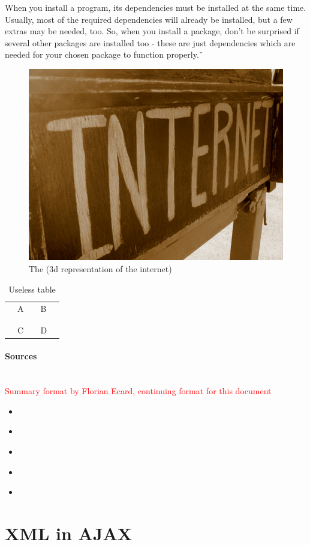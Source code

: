 \documentclass[10pt,a4paper]{article}
\begin{document}
When you install a program, its dependencies must be installed at the same time. Usually, most of the required dependencies will already be installed, but a few extras may be needed, too. So, when you install a package, don't be surprised if several other packages are installed too - these are just dependencies which are needed for your chosen package to function properly.¨\cite{patref3}
 
\begin{figure}[ht]
\includegraphics[width=.5in]{internet.jpg}
\caption{The (3d representation of the internet\cite{patref4})}
\end{figure}
 
\begin{table}[]
\centering
\caption{Useless table\cite{patref5}}
\label{my-label}
\begin{tabular}{lllll}
 & A  &  & B &  \\
 &  &  &  &  \\
 &  &  &  &  \\
 & C &  & D & 
\end{tabular}
\end{table}
 
 
\paragraph{Sources}
\\ 
\textcolor{red}{Summary format by Florian Ecard, continuing format for this document}
\begin{itemize}
\item \cite{patref1}
\item \cite{patref2} 
\item \cite{patref3}
\item \cite{patref4}
\item \cite{patref5}
\end{itemize}



\newpage
\section{XML in AJAX}
\end{document}
